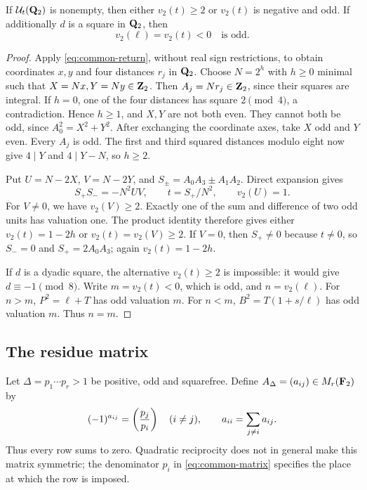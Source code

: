 \begin{lemma}\label{lem:common-dyadic}
If $\mathcal U_t(\mathbf Q_2)$ is nonempty, then either $v_2(t)\ge2$ or
$v_2(t)$ is negative and odd.  If additionally $d$ is a square in
$\mathbf Q_2$, then
\[
 v_2(\ell)=v_2(t)<0\quad\text{is odd}.
\]
\end{lemma}
\begin{proof}
Apply \eqref{eq:common-return}, without real sign restrictions, to obtain
coordinates $x,y$ and four distances $r_j$ in $\mathbf Q_2$.
Choose $N=2^h$ with $h\ge0$ minimal such that
$X=Nx,Y=Ny\in\mathbf Z_2$.  Then $A_j=Nr_j\in\mathbf Z_2$, since their squares
are integral.  If $h=0$, one of the four distances has square
$2\pmod4$, a contradiction.  Hence $h\ge1$, and $X,Y$ are not both
even.  They cannot both be odd, since $A_0^2=X^2+Y^2$.
After exchanging the coordinate axes, take $X$ odd and $Y$ even.
Every $A_j$ is odd.  The first and third squared distances modulo eight
now give $4\mid Y$ and $4\mid Y-N$, so $h\ge2$.

Put $U=N-2X$, $V=N-2Y$, and
$S_\pm=A_0A_3\pm A_1A_2$.  Direct expansion gives
\[
 S_+S_-=-N^2UV,\qquad t=S_+/N^2,\qquad v_2(U)=1.
\]
For $V\ne0$, we have $v_2(V)\ge2$.  Exactly one of the sum and
difference of two odd units has valuation one.  The product identity
therefore gives either $v_2(t)=1-2h$ or $v_2(t)=v_2(V)\ge2$.
If $V=0$, then $S_+\ne0$ because $t\ne0$, so $S_-=0$ and
$S_+=2A_0A_3$; again $v_2(t)=1-2h$.

If $d$ is a dyadic square, the alternative $v_2(t)\ge2$ is impossible:
it would give $d\equiv-1\pmod8$.  Write $m=v_2(t)<0$, which is odd,
and $n=v_2(\ell)$.  For $n>m$, $P^2=\ell+T$ has odd valuation $m$.
For $n<m$, $B^2=T(1+s/\ell)$ has odd valuation $m$.
Thus $n=m$.
\end{proof}

\subsection{The residue matrix}

Let $\Delta=p_1\cdots p_r>1$ be positive, odd and squarefree.  Define
$A_\Delta=(a_{ij})\in M_r(\mathbf F_2)$ by
\begin{equation}\label{eq:common-matrix}
 (-1)^{a_{ij}}=\left(\frac{p_j}{p_i}\right)\quad(i\ne j),\qquad
 a_{ii}=\sum_{j\ne i}a_{ij}.
\end{equation}
Thus every row sums to zero.  Quadratic reciprocity does not in general
make this matrix symmetric; the denominator $p_i$ in
\eqref{eq:common-matrix} specifies the place at which the row is imposed.

